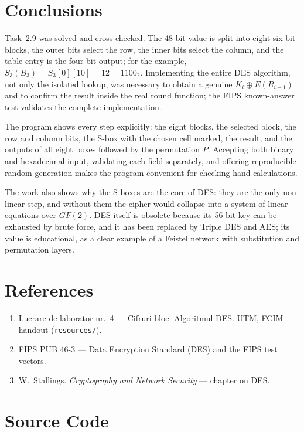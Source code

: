 \documentclass[12pt,a4paper]{article}
\begin{document}
\section{Conclusions}

Task~2.9 was solved and cross-checked. The 48-bit value is split into eight six-bit blocks, the outer bits select the row, the inner bits select the column, and the table entry is the four-bit output; for the example, $S_3(B_3)=S_3[0][10]=12=1100_2$. Implementing the entire DES algorithm, not only the isolated lookup, was necessary to obtain a genuine $K_i\oplus E(R_{i-1})$ and to confirm the result inside the real round function; the FIPS known-answer test validates the complete implementation.

The program shows every step explicitly: the eight blocks, the selected block, the row and column bits, the S-box with the chosen cell marked, the result, and the outputs of all eight boxes followed by the permutation $P$. Accepting both binary and hexadecimal input, validating each field separately, and offering reproducible random generation makes the program convenient for checking hand calculations.

The work also shows why the S-boxes are the core of DES: they are the only non-linear step, and without them the cipher would collapse into a system of linear equations over $GF(2)$. DES itself is obsolete because its 56-bit key can be exhausted by brute force, and it has been replaced by Triple DES and AES; its value is educational, as a clear example of a Feistel network with substitution and permutation layers.

\section*{References}

\begin{enumerate}\raggedright
  \item Lucrare de laborator nr.~4 --- Cifruri bloc. Algoritmul DES. UTM, FCIM --- handout (\texttt{resources/}).
  \item FIPS PUB 46-3 --- Data Encryption Standard (DES) and the FIPS test vectors.
  \item W.~Stallings. \textit{Cryptography and Network Security} --- chapter on DES.
\end{enumerate}

\section*{Source Code}
\end{document}
